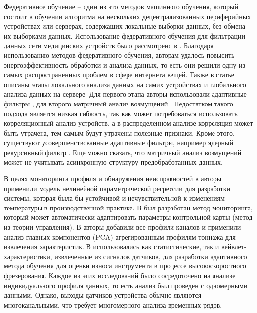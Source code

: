 Федеративное обучение -- один из это методов машинного обучения,
который состоит в обучении алгоритма на нескольких децентрализованных периферийных устройствах или серверах, 
содержащих локальные выборки данных, без обмена их выборками данных.
Использование федеративного обучения для фильтрации данных сети медицинских устройств было рассмотрено в \cite{8-paper}.
Благодаря использованию методов федеративного обучения, авторам удалось повысить энергоэффективность обработки и анализа данных,
то есть они решили одну из самых распространенных проблем в сфере интернета вещей.
Также в статье описаны этапы локального анализа данных на самих устройствах и глобального анализа данных на сервере.
Для первого этапа авторы использовали адаптивные фильтры \cite{adaptive-filter}, для второго матричный анализ возмущений \cite{pertuberation}.
Недостатком такого подхода является низкая гибкость, так как может потребоваться использовать корреляционный анализ устройств,
а в распределенном анализе корреляция может быть утрачена, тем самым будут утрачены полезные признаки.
Кроме этого, существуют усовершенствованные адаптивные фильтры, например ядерный рекурсивный фильтр \cite{krls-t}.
Еще можно сказать, что матричный анализ возмущений может не учитывать асинхронную структуру предобработанных данных.
 
В целях мониторинга профиля и обнаружения неисправностей в \cite{4-8} авторы применили модель нелинейной 
параметрической регрессии для разработки системы, которая была бы устойчивой и нечувствительной 
к изменениям температуры в производственной практике. 
В \cite{4-9} был разработан метод мониторинга, который может автоматически адаптировать параметры контрольной карты (метод из теории управления). 
В \cite{4-10} авторы добавили все профили каналов и применили анализ главных компонентов (PCA) 
агрегированным профилям тоннажа для извлечения характеристик. 
В \cite{4-12} использовались как статистические, 
так и вейвлет-характеристики, извлеченные из сигналов датчиков, 
для разработки адаптивного метода обучения для оценки износа инструмента в процессе высокоскоростного фрезерования. 
Каждое из этих исследований было сосредоточено на анализе индивидуального профиля данных, то есть анализ был проведен с одномерными данными.
Однако, выходы датчиков устройства обычно являются многоканальными, что требует многомерного анализа временных рядов.

